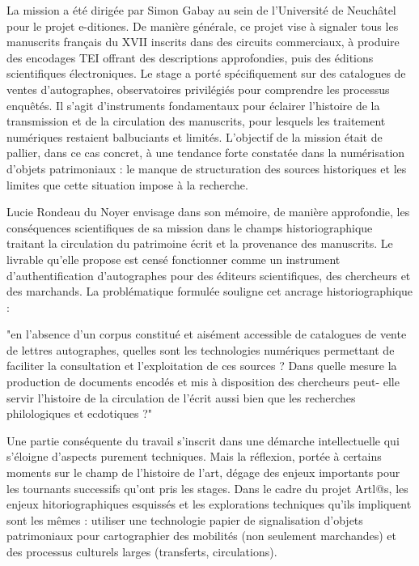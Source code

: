 \documentclass[a4paper,12pt,twoside]{book}
\begin{document}
La mission a été dirigée par Simon Gabay au sein de l'Université de Neuchâtel pour le projet e-ditiones. De manière générale, ce projet vise à signaler tous les manuscrits français du XVII inscrits dans des circuits commerciaux, à produire des encodages TEI offrant des descriptions approfondies, puis des éditions scientifiques électroniques. Le stage a porté spécifiquement sur des catalogues de ventes d'autographes, observatoires privilégiés pour comprendre les processus enquêtés. Il s'agit d'instruments fondamentaux pour éclairer l'histoire de la transmission et de la circulation des manuscrits, pour lesquels les traitement numériques restaient balbuciants et limités. L'objectif de la mission était de pallier, dans ce cas concret, à une tendance forte constatée dans la numérisation d'objets patrimoniaux : le manque de structuration des sources historiques et les limites que cette situation impose à la recherche. 

Lucie Rondeau du Noyer envisage dans son mémoire, de manière approfondie, les conséquences scientifiques de sa mission dans le champs historiographique traitant la circulation du patrimoine écrit et la provenance des manuscrits. Le livrable qu'elle propose est censé fonctionner comme un instrument d'authentification d'autographes pour des éditeurs scientifiques, des chercheurs et des marchands. La problématique formulée souligne cet ancrage historiographique : 

"en l’absence d’un corpus constitué et aisément accessible de catalogues de vente de lettres autographes, quelles sont les technologies numériques permettant de faciliter la consultation et l’exploitation de ces sources ? Dans quelle mesure la production de documents encodés et mis à disposition des chercheurs peut- elle servir l’histoire de la circulation de l’écrit aussi bien que les recherches philologiques et ecdotiques ?"

Une partie conséquente du travail s'inscrit dans une démarche intellectuelle qui s'éloigne d'aspects purement techniques. Mais la réflexion, portée à certains moments sur le champ de l'histoire de l'art, dégage des enjeux importants pour les tournants successifs qu'ont pris les stages. Dans le cadre du projet Artl@s, les enjeux hitoriographiques esquissés et les explorations techniques qu'ils impliquent sont les mêmes : utiliser une technologie papier de signalisation d'objets patrimoniaux pour cartographier des mobilités (non seulement marchandes) et des processus culturels larges (transferts, circulations). 
\end{document}
